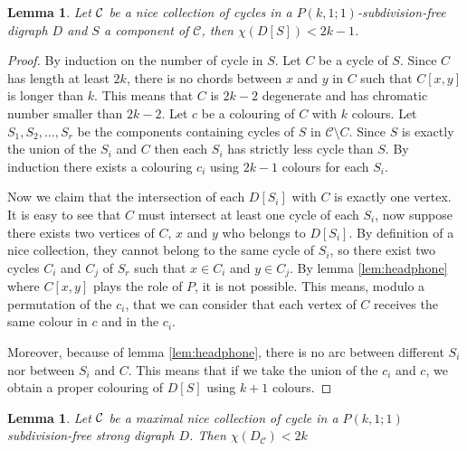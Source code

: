 \documentclass[utf8,10pt]{article}
\theoremstyle{plain}
\newtheorem{lemma}[theorem]{Lemma}
\theoremstyle{definition}
\theoremstyle{remark}
\begin{document}
 
\begin{lemma}\label{lem:compo1}
Let ${\cal C}$ be a nice collection of cycles in a $P(k,1;1)$-subdivision-free digraph $D$ and $S$ a component of $\mathcal{C}$, then $\chi(D[S]) < 2k-1$.	 
\end{lemma}

\begin{proof}
By induction on the number of cycle in $S$. Let $C$ be a cycle of $S$. Since $C$ has length at least $2k$, there is no chords between $x$ and $y$ in $C$
such that $C[x,y]$ is longer than $k$. This means that $C$ is $2k-2$ degenerate and has chromatic number smaller than $2k -2$. Let $c$ be a colouring of $C$ with
$k$ colours. Let $S_1, S_2, \dots, S_r$ be the components containing cycles of $S$ in $\mathcal{C} \setminus{C}$. Since $S$ is exactly the union of the $S_i$ and $C$
then each $S_i$ has strictly less cycle than $S$. By induction there exists a colouring $c_i$ using $2k-1$ colours for each $S_i$.
 
Now we claim that the intersection of each $D[S_i]$ with $C$ is exactly one vertex. It is easy to see that $C$ must intersect at least one cycle of each $S_i$, 
now suppose there exists two vertices of $C$, $x$ and $y$ who belongs to $D[S_i]$. By definition of a nice collection, they cannot belong to the same cycle 
of $S_i$, so there exist two cycles $C_i$ and $C_j$ of $S_r$ such that $x \in C_i$ and $y \in C_j$. By lemma \ref{lem:headphone} where $C[x,y]$ plays the role
of $P$, it is not possible. This means, modulo a permutation of the $c_i$,
that we can consider that each vertex of $C$ receives the same colour in $c$ and in the $c_i$. 

Moreover, because of lemma \ref{lem:headphone}, there is no arc between different $S_i$ nor between $S_i$ and $C$. This means that if we take the union of the 
$c_i$ and $c$, we obtain a proper colouring of $D[S]$ using $k+1$ colours. 
\end{proof}


\begin{lemma}\label{lem:reduce}
Let ${\cal C}$ be a maximal nice collection of cycle in a $P(k,1;1)$ subdivision-free strong digraph $D$. Then $\chi(D_{\mathcal{C}}) < 2k$
\end{lemma}
\end{document}
